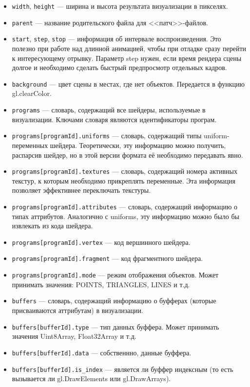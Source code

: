 \begin{itemize}
\item \texttt{width}, \texttt{height} --- ширина и высота результата визуализации в пикселях.
\item \texttt{parent} --- название родительского файла для <<патч>>-файлов.
\item \texttt{start}, \texttt{step}, \texttt{stop} --- информация об интервале воспроизведения. Это полезно при работе над длинной анимацией, чтобы при отладке сразу перейти к интересующему отрывку. Параметр step нужен, если время рендера сцены долгое и необходимо сделать быстрый предпросмотр отдельных кадров.
\item \texttt{background} --- цвет сцены в местах, где нет объектов. Передается в функцию gl.clearColor.
\item \texttt{programs} --- словарь, содержащий все шейдеры, используемые в визуализации. Ключами словаря являются идентификаторы програм.
\item \texttt{programs[programId].uniforms} --- словарь, содержащий типы uniform-переменных шейдера. Теоретически, эту информацию можно получить, распарсив шейдер, но в этой версии формата её необходимо передавать явно.
\item \texttt{programs[programId].textures} --- словарь, содержащий номера активных текстур, к которым необходимо прикреплять переменные. Эта информация позволяет эффективнее переключать текстуры.
\item \texttt{programs[programId].attributes} --- словарь, содержащий информацию о типах аттрибутов. Аналогично с uniforms, эту информацию можно было бы извлекать из кода шейдера.
\item \texttt{programs[programId].vertex} --- код вершинного шейдера.
\item \texttt{programs[programId].fragment} --- код фрагментного шейдера.
\item \texttt{programs[programId].mode} --- режим отображения объектов. Может принимать значения: POINTS, TRIANGLES, LINES и т.д.
\item \texttt{buffers} --- словарь, содержащий информацию о буфферах (которые присваиваются аттрибутам) в визуализации.
\item \texttt{buffers[bufferId].type} --- тип данных буффера. Может принимать значения Uint8Array, Float32Array и т.д.
\item \texttt{buffers[bufferId].data} --- собственнно, данные буффера.
\item \texttt{buffers[bufferId].is\_index} --- является ли буффер индексным (то есть вызывается ли gl.DrawElements или gl.DrawArrays).

\end{itemize}
